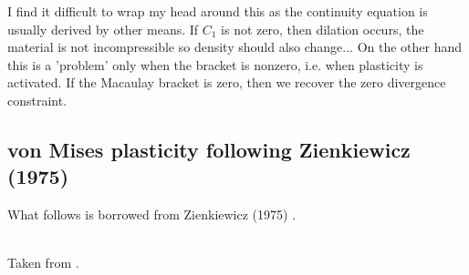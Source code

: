 
I find it difficult to wrap my head around this as the continuity equation 
is usually derived by other means. 
If $C_1$ is not zero, then dilation occurs, the material is not incompressible
so density should also change...  
On the other hand this is a 'problem' only when the bracket is nonzero, i.e. when
plasticity is activated. If the Macaulay bracket is zero, then we recover 
the zero divergence constraint.

\subsection{von Mises plasticity following Zienkiewicz (1975)}

What follows is borrowed from Zienkiewicz (1975) \cite{zien75}.

\begin{center}
\\
{\captionfont Taken from \textcite{zien75}.}
\end{center}

